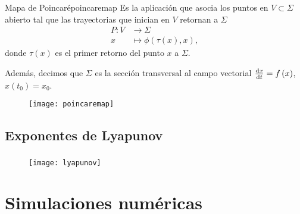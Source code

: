 \begin{frame}
	\frametitle{\subsecname~\parencite[Sección 5.3, pág. 168]{Viana2021}}

	\begin{minipage}{0.6\textwidth}
		\begin{definition}{Mapa de Poincaré}{poincaremap}
			Es la aplicación que asocia los puntos en $V\subset\Sigma$ abierto
			tal que las trayectorias que inician en $V$ retornan a $\Sigma$
			\begin{align*}
				P\colon V & \to\Sigma                                      \\
				x         & \mapsto\phi\left(\tau\left(x\right), x\right),
			\end{align*}
			donde $\tau\left(x\right)$ es el primer retorno del punto $x$ a
			$\Sigma$.

			Además, decimos que $\Sigma$ es la sección transversal al campo
			vectorial $\diff{x}{t}=f\left(x\right)$, $x\left(t_{0}\right)=x_{0}$.
		\end{definition}
	\end{minipage}
	\begin{minipage}{0.3\textwidth}
		\begin{figure}[ht!]
			\centering
			\texttt{[image: poincaremap]}
		\end{figure}
	\end{minipage}

\end{frame}


\subsection{Exponentes de Lyapunov}

\begin{frame}
	\frametitle{\subsecname}

	\begin{figure}[ht!]
		\centering
		\texttt{[image: lyapunov]}
	\end{figure}
\end{frame}

\section{Simulaciones numéricas}


